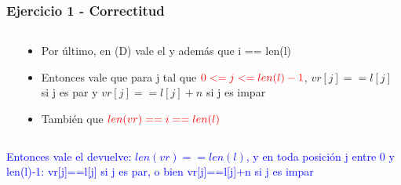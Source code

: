 \begin{frame}[fragile]\frametitle{Ejercicio 1 - Correctitud}
\begin{columns}
\begin{column}{0.35\textwidth}

\end{column}
\begin{column}{0.65\textwidth}

\begin{itemize}[<+->]
  \item Por \'ultimo, en (D) vale el \I y adem\'as que i == len(l)
  \item Entonces vale que para j tal que $\textcolor{red}{0 <= j <= len(l)-1}$, $vr[j] == l[j]$ si j es par y $vr[j] == l[j]+n$ si j es impar
  \item Tambi\'en que $\textcolor{red}{len(vr) == i == len(l)}$
\end{itemize}

\end{column}
\end{columns}
\pause
\textcolor{blue}{Entonces vale el devuelve: $len(vr)==len(l)$, y en toda posici\'on j entre 0 y len(l)-1:
          vr[j]==l[j] si j es par, o bien vr[j]==l[j]+n si j es impar}
\end{frame}



